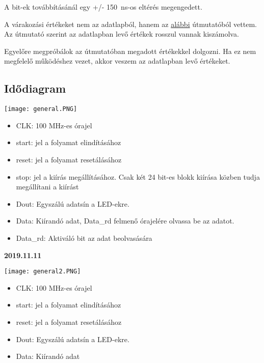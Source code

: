 \documentclass[10pt]{article} %
\begin{document}
\noindent A bit-ek továbbításánál egy +/- \SI{150}{\nano\second}-os eltérés megengedett.

A várakozási értékeket nem az adatlapból, hanem az \href{https://learn.adafruit.com/adafruit-neopixel-uberguide}{alábbi} útmutatóból vettem. Az útmutató szerint az adatlapban levő értékek rosszul vannak kiszámolva.

Egyelőre megpróbálok az útmutatóban megadott értékekkel dolgozni. Ha ez nem megfelelő működéshez vezet, akkor veszem az adatlapban levő értékeket.

\subsection{Idődiagram}

\texttt{[image: general.PNG]}

\begin{itemize}
\item CLK: 100 MHz-es órajel
\item start: jel a folyamat elindításához
\item reset: jel a folyamat resetálásához
\item stop: jel a kiírás megállításához. Csak két 24 bit-es blokk kiírása közben tudja megállítani a kiírást
\item Dout: Egyszálú adatsín a LED-ekre.
\item Data: Kiírandó adat, Data\_rd felmenő órajelére olvassa be az adatot.
\item Data\_rd: Aktiváló bit az adat beolvasására
\end{itemize}

\textbf{2019.11.11}

\texttt{[image: general2.PNG]}

\begin{itemize}
\item CLK: 100 MHz-es órajel
\item start: jel a folyamat elindításához
\item reset: jel a folyamat resetálásához
\item Dout: Egyszálú adatsín a LED-ekre.
\item Data: Kiírandó adat
\end{itemize}
\end{document}
